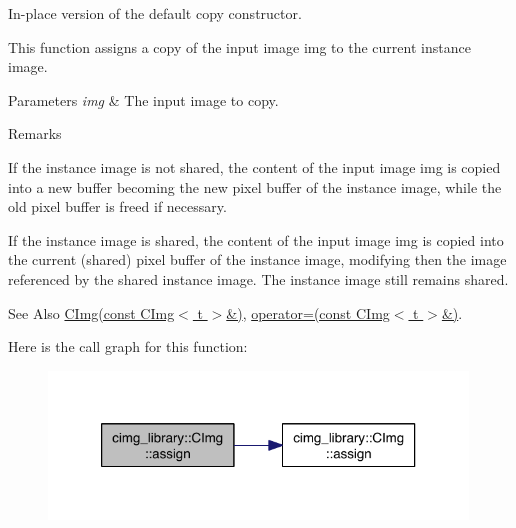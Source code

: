 In-\/place version of the default copy constructor. 

This function assigns a copy of the input image {\ttfamily img} to the current instance image. 
\begin{DoxyParams}{Parameters}
{\em img} & The input image to copy. \\
\hline
\end{DoxyParams}
\begin{DoxyRemark}{Remarks}

\begin{DoxyItemize}
\item If the instance image is not shared, the content of the input image {\ttfamily img} is copied into a new buffer becoming the new pixel buffer of the instance image, while the old pixel buffer is freed if necessary.
\item If the instance image is shared, the content of the input image {\ttfamily img} is copied into the current (shared) pixel buffer of the instance image, modifying then the image referenced by the shared instance image. The instance image still remains shared. 
\end{DoxyItemize}
\end{DoxyRemark}
\begin{DoxySeeAlso}{See Also}
\hyperlink{structcimg__library_1_1_c_img_a77871bed283c449b2e9ed5624811c68e}{C\-Img(const C\-Img$<$ t $>$\&)}, \hyperlink{structcimg__library_1_1_c_img_aa00643fa0ff78f1376773dd18360e872}{operator=(const C\-Img$<$ t $>$\&)}. 
\end{DoxySeeAlso}


Here is the call graph for this function\-:
\nopagebreak
\begin{figure}[H]
\begin{center}
\leavevmode
\includegraphics[width=316pt]{structcimg__library_1_1_c_img_a7adf0edeca1ab85b0d23f3900ca51fb6_cgraph}
\end{center}
\end{figure}


